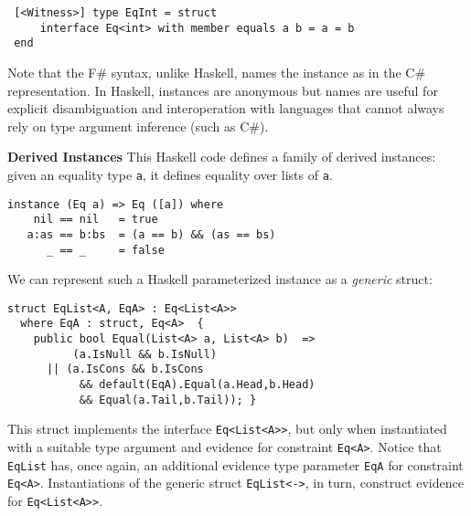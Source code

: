 \documentclass[9pt]{sig-alternate-05-2015}
\begin{document}
\begin{lstlisting}
 [<Witness>] type EqInt = struct 
     interface Eq<int> with member equals a b = a = b
 end 
\end{lstlisting}

Note that the F\# syntax, unlike Haskell, names the instance as in the  C\# representation.
In Haskell, instances are anonymous but names are useful for explicit disambiguation and interoperation with languages that cannot always rely on type argument inference (such as C\#).
\fi


{\bf Derived Instances}
This Haskell code defines a family of derived instances: given an equality  type \lstinline{a}, it defines equality over lists of \lstinline{a}.
{\small
\begin{lstlisting}
instance (Eq a) => Eq ([a]) where 
    nil == nil   = true
   a:as == b:bs  = (a == b) && (as == bs)
      _ == _     = false
\end{lstlisting}
}

We can represent such a Haskell parameterized instance as a \emph{generic} struct:


\begin{lstlisting}
struct EqList<A, EqA> : Eq<List<A>>
  where EqA : struct, Eq<A>  {
    public bool Equal(List<A> a, List<A> b)  =>
          (a.IsNull && b.IsNull)
      || (a.IsCons && b.IsCons 
           && default(EqA).Equal(a.Head,b.Head) 
           && Equal(a.Tail,b.Tail)); }
\end{lstlisting}

This struct implements the interface \lstinline{Eq<List<A>>}, but only when instantiated with a suitable type argument and evidence for constraint \lstinline{Eq<A>}.
Notice that \lstinline{EqList} has, once again, an additional evidence type parameter  \lstinline{EqA} for constraint \lstinline{Eq<A>}.
Instantiations of the generic struct \lstinline{EqList<->}, in turn, construct evidence for \lstinline{Eq<List<A>>}.
\end{document}
